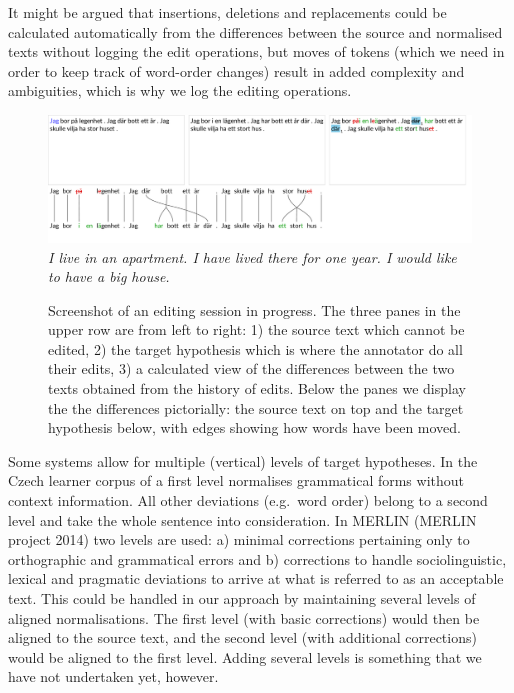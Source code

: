 \documentclass[10pt, a4paper]{article}
\begin{document}
It might be argued that insertions, deletions and
replacements could be calculated automatically from the differences between the source and normalised texts without logging the edit operations, but moves of tokens (which we need in order to keep track of word-order changes) result in added complexity \cite{ShapiraStorer2007} and ambiguities, which is why we log the editing operations.

\begin{figure}
\includegraphics[width=\textwidth, trim={0 1cm 0 0}, clip]{screenshot.pdf}
\emph{\small I live in an apartment. I have lived there for one year. I would like to have a big house.}
\caption{Screenshot of an editing session in progress. The three panes in the upper row are from left to right:
1) the source text which cannot be edited,
2) the target hypothesis which is where the annotator do all their edits,
3) a calculated view of the differences between the two texts obtained from the history of edits.
Below the panes we display the the differences pictorially:
the source text on top and the target hypothesis below, with edges
showing how words have been moved.
\label{fig:screenshot}
}
\end{figure}

Some systems allow for multiple (vertical) levels of target hypotheses. In the Czech learner corpus of  a
first level normalises grammatical forms without context information. All other deviations (e.g.\ word order) belong to a second level and take the whole sentence into consideration.
In MERLIN (MERLIN project 2014) two levels are used: a) minimal corrections pertaining only to orthographic and grammatical errors and b) corrections to handle sociolinguistic, lexical and pragmatic deviations to arrive at what is referred to as an acceptable text. This could be handled in our approach by maintaining several levels of aligned normalisations. The first level (with basic corrections) would then be aligned to the source text, and the second level (with additional corrections) would be aligned to the first level. Adding several levels is something that we have not undertaken yet, however.
\end{document}
